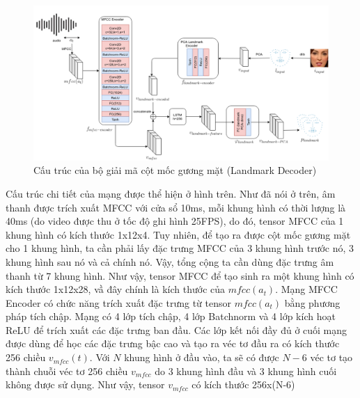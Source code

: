 \begin{figure}[H]
    \centering
    \includegraphics[width=15cm]{./content/materials/landmark_decoder.png}
    \caption{Cấu trúc của bộ giải mã cột mốc gương mặt (Landmark Decoder)}
\end{figure}

Cấu trúc chi tiết của mạng được thể hiện ở hình trên. Như đã nói ở trên, âm thanh được trích xuất MFCC với cửa sổ 10ms, mỗi khung hình có thời lượng là 40ms (do video được thu ở tốc độ ghi hình 25FPS), do đó, tensor MFCC của 1 khung hình có kích thước 1x12x4. Tuy nhiên, để tạo ra được cột mốc gương mặt cho 1 khung hình, ta cần phải lấy đặc trưng MFCC của 3 khung hình trước nó, 3 khung hình sau nó và cả chính nó. Vậy, tổng cộng ta cần dùng đặc trưng âm thanh từ 7 khung hình. Như vậy, tensor MFCC để tạo sinh ra một khung hình có kích thước 1x12x28, vầ đây chính là kích thước của $mfcc(a_t)$. Mạng MFCC Encoder có chức năng trích xuất đặc trưng từ tensor $mfcc(a_t)$ bằng phương pháp tích chập. Mạng có 4 lớp tích chập, 4 lớp Batchnorm và 4 lớp kích hoạt ReLU để trích xuất các đặc trưng ban đầu. Các lớp kết nối đầy đủ ở cuối mạng được dùng để học các đặc trưng bậc cao và tạo ra véc tơ đầu ra có kích thước 256 chiều $v_{mfcc}(t)$. Với $N$ khung hình ở đầu vào, ta sẽ có được $N-6$ véc tơ tạo thành chuỗi véc tơ 256 chiều $v_{mfcc}$ do 3 khung hình đầu và 3 khung hình cuối không được sử dụng. Như vậy, tensor $v_{mfcc}$ có kích thước 256x(N-6)

